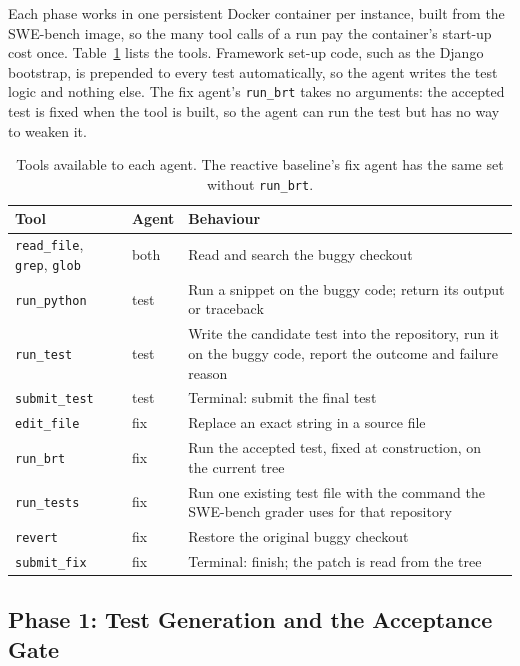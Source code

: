 Each phase works in one persistent Docker container per instance, built from
the SWE-bench image, so the many tool calls of a run pay the container's
start-up cost once. Table~\ref{tab:tools} lists the tools. Framework set-up
code, such as the Django bootstrap, is prepended to every test automatically,
so the agent writes the test logic and nothing else. The fix agent's \texttt{run\_brt}
takes no arguments: the accepted test is fixed when the tool is built, so the
agent can run the test but has no way to weaken it.

\begin{table}[t]
  \caption{Tools available to each agent. The reactive baseline's fix agent
  has the same set without \texttt{run\_brt}.}
  \label{tab:tools}
  \small
  \begin{tabularx}{\linewidth}{@{}llX@{}}
    \toprule
    Tool & Agent & Behaviour \\
    \midrule
    \texttt{read\_file}, \texttt{grep}, \texttt{glob} & both & Read and search the buggy checkout \\
    \texttt{run\_python} & test & Run a snippet on the buggy code; return its output or traceback \\
    \texttt{run\_test} & test & Write the candidate test into the repository, run it on the buggy code, report the outcome and failure reason \\
    \texttt{submit\_test} & test & Terminal: submit the final test \\
    \texttt{edit\_file} & fix & Replace an exact string in a source file \\
    \texttt{run\_brt} & fix & Run the accepted test, fixed at construction, on the current tree \\
    \texttt{run\_tests} & fix & Run one existing test file with the command the SWE-bench grader uses for that repository \\
    \texttt{revert} & fix & Restore the original buggy checkout \\
    \texttt{submit\_fix} & fix & Terminal: finish; the patch is read from the tree \\
    \bottomrule
  \end{tabularx}
\end{table}

\subsection{Phase 1: Test Generation and the Acceptance Gate}
\label{sec:method-phase1}


